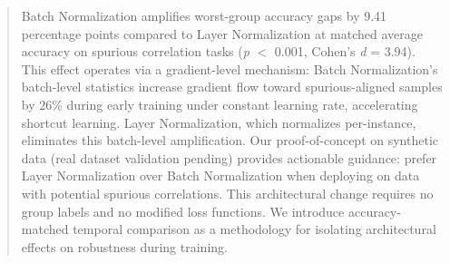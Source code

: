 \begin{abstract}
Batch Normalization amplifies worst-group accuracy gaps by 9.41 percentage points compared to Layer Normalization at matched average accuracy on spurious correlation tasks (\emph{p} $<$ 0.001, Cohen's \emph{d} = 3.94). This effect operates via a gradient-level mechanism: Batch Normalization's batch-level statistics increase gradient flow toward spurious-aligned samples by 26\% during early training under constant learning rate, accelerating shortcut learning. Layer Normalization, which normalizes per-instance, eliminates this batch-level amplification. Our proof-of-concept on synthetic data (real dataset validation pending) provides actionable guidance: prefer Layer Normalization over Batch Normalization when deploying on data with potential spurious correlations. This architectural change requires no group labels and no modified loss functions. We introduce accuracy-matched temporal comparison as a methodology for isolating architectural effects on robustness during training.
\end{abstract}
